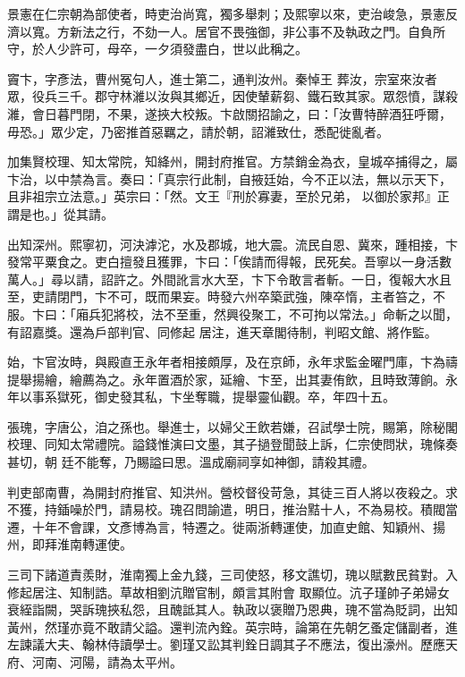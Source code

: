 \begin{pinyinscope}
 景憲在仁宗朝為部使者，時吏治尚寬，獨多舉刺；及熙寧以來，吏治峻急，景憲反濟以寬。方新法之行，不劾一人。居官不畏強御，非公事不及執政之門。自負所守，於人少許可，母卒，一夕須發盡白，世以此稱之。



 竇卞，字彥法，曹州冤句人，進士第二，通判汝州。秦悼王
 葬汝，宗室來汝者眾，役兵三千。郡守林濰以汝與其鄉近，因使輦薪芻、鐵石致其家。眾怨憤，謀殺濰，會日暮門閉，不果，遂挾大校叛。卞啟關招諭之，曰：「汝曹特醉酒狂呼爾，毋恐。」眾少定，乃密推首惡羈之，請於朝，詔濰致仕，悉配徙亂者。



 加集賢校理、知太常院，知絳州，開封府推官。方禁銷金為衣，皇城卒捕得之，屬卞治，以中禁為言。奏曰：「真宗行此制，自掖廷始，今不正以法，無以示天下，且非祖宗立法意。」英宗曰：「然。文王『刑於寡妻，至於兄弟，
 以御於家邦』正謂是也。」從其請。



 出知深州。熙寧初，河決滹沱，水及郡城，地大震。流民自恩、冀來，踵相接，卞發常平粟食之。吏白擅發且獲罪，卞曰：「俟請而得報，民死矣。吾寧以一身活數萬人。」尋以請，詔許之。外間訛言水大至，卞下令敢言者斬。一日，復報大水且至，吏請閉門，卞不可，既而果妄。時發六州卒築武強，陳卒惰，主者笞之，不服。卞曰：「廂兵犯將校，法不至重，然興役聚工，不可拘以常法。」命斬之以聞，有詔嘉獎。還為戶部判官、同修起
 居注，進天章閣待制，判昭文館、將作監。



 始，卞官汝時，與殿直王永年者相接頗厚，及在京師，永年求監金曜門庫，卞為禱提舉揚繪，繪薦為之。永年置酒於家，延繪、卞至，出其妻侑飲，且時致薄餉。永年以事系獄死，御史發其私，卞坐奪職，提舉靈仙觀。卒，年四十五。



 張瑰，字唐公，洎之孫也。舉進士，以婦父王飲若嫌，召試學士院，賜第，除秘閣校理、同知太常禮院。謚錢惟演曰文墨，其子撾登聞鼓上訴，仁宗使問狀，瑰條奏甚切，朝
 廷不能奪，乃賜謚曰思。溫成廟祠享如神御，請殺其禮。



 判吏部南曹，為開封府推官、知洪州。營校督役苛急，其徒三百人將以夜殺之。求不獲，持鍤噪於門，請易校。瑰召問諭遣，明日，推治黠十人，不為易校。積閥當遷，十年不會課，文彥博為言，特遷之。徙兩浙轉運使，加直史館、知穎州、揚州，即拜淮南轉運使。



 三司下諸道責羨財，淮南獨上金九錢，三司使怒，移文譙切，瑰以賦數民貧對。入修起居注、知制誥。草故相劉沆贈官制，頗言其附會
 取顯位。沆子瑾帥子弟婦女衰絰詣闕，哭訴瑰挾私怨，且醜詆其人。執政以褒贈乃恩典，瑰不當為貶詞，出知黃州，然瑾亦竟不敢請父謚。還判流內銓。英宗時，論第在先朝乞蚤定儲副者，進左諫議大夫、翰林侍讀學士。劉瑾又訟其判銓日調其子不應法，復出濠州。歷應天府、河南、河陽，請為太平州。




\end{pinyinscope}
